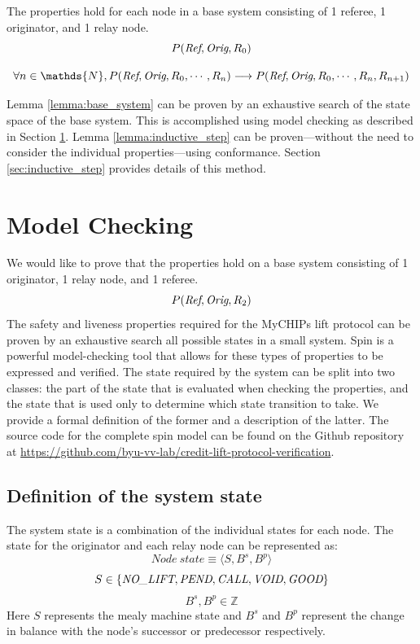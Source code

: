 \documentclass[runningheads]{llncs}
\newcommand{\nolift}{\emph{NO\_LIFT}}
\newcommand{\pend}{\emph{PEND}}
\newcommand{\call}{\emph{CALL}}
\newcommand{\void}{\emph{VOID}}
\newcommand{\good}{\emph{GOOD}}
\newcommand{\coderepository}{Github repository at \url{https://github.com/byu-vv-lab/credit-lift-protocol-verification}}
\newif\ifcomments
\newcommand{\krs}[1]{\ifcomments\textcolor{blue}{krs: #1}\fi}
\begin{document}
\begin{lemma}
\label{lemma:base_system}
The properties hold for each node in a base system consisting of 1 referee, 1 originator, and 1 relay node.
$$
P(\emph{Ref}, \emph{Orig}, R_0)
$$
\end{lemma}

\begin{lemma}
\label{lemma:inductive_step}
$$
\forall n \in \mathds{N}, P(\emph{Ref}, \emph{Orig}, R_0, \dotsm, R_n) \longrightarrow P(\emph{Ref}, \emph{Orig}, R_0, \dotsm, R_n, R_{n+1})
$$
\end{lemma}

Lemma \ref{lemma:base_system} can be proven by an exhaustive search of the state space of the base system. This is accomplished using model checking as described in Section \ref{chap:model_checking_results}. Lemma \ref{lemma:inductive_step} can be proven---without the need to consider the individual properties---using conformance. Section \ref{sec:inductive_step} provides details of this method.
\krs{I feel like I should emphasize here that using this method you can verify new properties quicky by checking them in the model checker and know that those propeties extend to any number of nodes}

\section{Model Checking} \label{chap:model_checking_results}
We would like to prove that the properties hold on a base system consisting of 1 originator, 1 relay node, and 1 referee.
$$
P(\emph{Ref}, \emph{Orig}, R_2)
$$
The safety and liveness properties required for the MyCHIPs lift protocol can be proven by an exhaustive search all possible states in a small system. Spin is a powerful model-checking tool that allows for these types of properties to be expressed and verified. The state required by the system can be split into two classes: the part of the state that is evaluated when checking the properties, and the state that is used only to determine which state transition to take. We provide a formal definition of the former and a description of the latter. The source code for the complete spin model can be found on the \coderepository.
\subsection{Definition of the system state}\label{sec:statedef}
The system state is a combination of the individual states for each node. The state for the originator and each relay node can be represented as:
$$Node~state \equiv \langle S, B^s, B^p \rangle$$
$$
S \in \{\nolift, \pend, \call, \void, \good\}
$$
$$
B^s, B^p \in \mathds{Z}
$$
Here $S$ represents the mealy machine state and $B^s$ and $B^p$ represent the change in balance with the node's successor or predecessor respectively.
\end{document}
